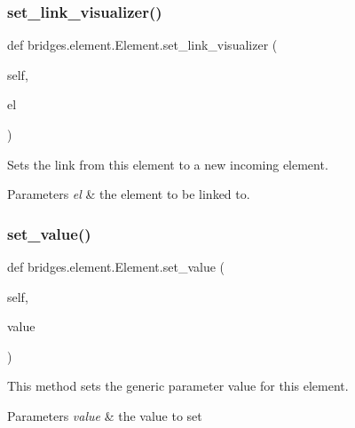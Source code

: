 \subsubsection{\texorpdfstring{set\+\_\+link\+\_\+visualizer()}{set\_link\_visualizer()}}
{\footnotesize\ttfamily def bridges.\+element.\+Element.\+set\+\_\+link\+\_\+visualizer (\begin{DoxyParamCaption}\item[{}]{self,  }\item[{}]{el }\end{DoxyParamCaption})}



Sets the link from this element to a new incoming element. 


\begin{DoxyParams}{Parameters}
{\em el} & the element to be linked to. \\
\hline
\end{DoxyParams}
\mbox{\label{classbridges_1_1element_1_1_element_a609e3d9fc11194f70f4b053ffe19ea62}} 
\subsubsection{\texorpdfstring{set\+\_\+value()}{set\_value()}}
{\footnotesize\ttfamily def bridges.\+element.\+Element.\+set\+\_\+value (\begin{DoxyParamCaption}\item[{}]{self,  }\item[{}]{value }\end{DoxyParamCaption})}



This method sets the generic parameter value for this element. 


\begin{DoxyParams}{Parameters}
{\em value} & the value to set \\
\hline
\end{DoxyParams}
\mbox{\label{classbridges_1_1element_1_1_element_a9aedfbef600fe7b97f84ae0a8ec1f8fa}} 
